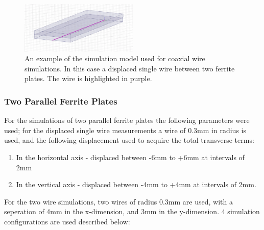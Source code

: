 \begin{figure}
\begin{center}
\includegraphics[width=0.5\textwidth]{Bench_Top_Measurements/figures/cross-section-coaxial-wire-measurements.png}
\end{center}
\label{fig:wire-sim-model}
\caption{An example of the simulation model used for coaxial wire simulations. In this case a displaced single wire between two ferrite plates. The wire is highlighted in purple.}
\end{figure}

\subsubsection{Two Parallel Ferrite Plates}

For the simulations of two parallel ferrite plates the following parameters were used; for the displaced single wire measurements a wire of 0.3mm in radius is used, and the following displacement used to acquire the total transverse terms:

\begin{enumerate}
\item{In the horizontal axis -  displaced between -6mm to +6mm at intervals of 2mm}
\item{In the vertical axis - displaced between -4mm to +4mm at intervals of 2mm.}
\end{enumerate}

For the two wire simulations, two wires of radius 0.3mm are used, with a seperation of 4mm in the x-dimension, and 3mm in the y-dimension. 4 simulation configurations are used described below:

